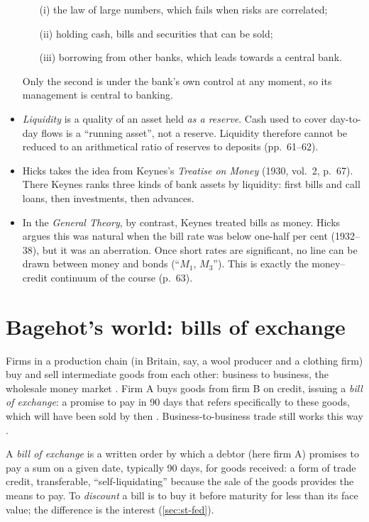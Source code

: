 \begin{paracol}{2}
\begin{reading}
\begin{itemize}
  \begin{enumerate}
    \item[(i)] the law of large numbers, which fails when risks are correlated;
    \item[(ii)] holding cash, bills and securities that can be sold;
    \item[(iii)] borrowing from other banks, which leads towards a central bank.
  \end{enumerate}
  Only the second is under the bank's own control at any moment, so its management is central to banking.
  \item \emph{Liquidity} is a quality of an asset held \emph{as a reserve}. Cash used to cover day-to-day flows is a ``running asset'', not a reserve. Liquidity therefore cannot be reduced to an arithmetical ratio of reserves to deposits (pp.~61--62).
  \item Hicks takes the idea from Keynes's \emph{Treatise on Money} (1930, vol.~2, p.~67). There Keynes ranks three kinds of bank assets by liquidity: first bills and call loans, then investments, then advances.
  \item In the \emph{General Theory}, by contrast, Keynes treated bills as money. Hicks argues this was natural when the bill rate was below one-half per cent (1932--38), but it was an aberration. Once short rates are significant, no line can be drawn between money and bonds (``$M_1$, $M_3$''). This is exactly the money--credit continuum of the course (p.~63).
\end{itemize}
\end{reading}

\section{Bagehot's world: bills of exchange}\label{sec:bg-bills}

Firms in a production chain (in Britain, say, a wool producer and a clothing firm) buy and sell intermediate goods from each other: business to business, the
wholesale money market . Firm A buys goods from firm B on credit, issuing a \emph{bill of exchange}: a promise to
pay in 90 days that refers specifically to these goods, which will have been sold by then . Business-to-business
trade still works this way .

\begin{definition}\label{def:bg-bill}
A \emph{bill of exchange} is a written order by which a debtor (here firm A) promises to pay a sum on a given date, typically 90 days, for goods received: a form of trade
credit, transferable, ``self-liquidating'' because the sale of the goods provides the means to pay. To \emph{discount} a bill is to buy it before maturity for less than
its face value; the difference is the interest (\cref{sec:st-fed}).
\end{definition}


\end{paracol}
